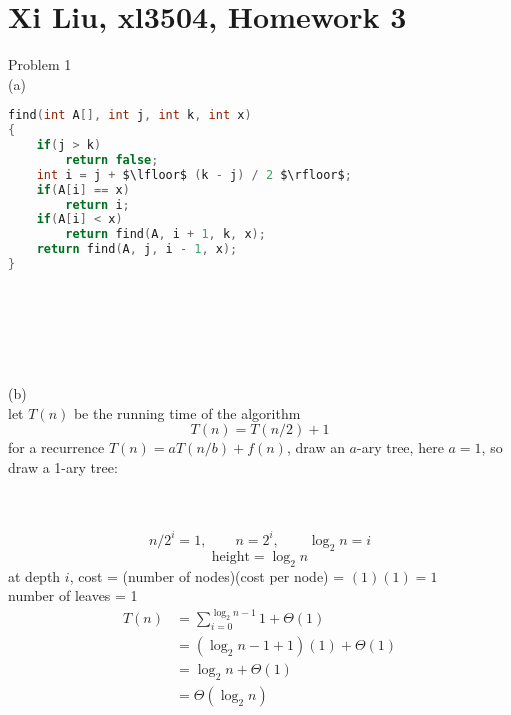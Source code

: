 \documentclass[12pt,border=4pt,multi]{article}%
\begin{document}
\section*{Xi Liu, xl3504, Homework 3}
Problem 1\\
(a)
\begin{lstlisting}[language = c, mathescape = true]
find(int A[], int j, int k, int x)
{
    if(j > k)
        return false;
    int i = j + $\lfloor$ (k - j) / 2 $\rfloor$;
    if(A[i] == x)
        return i;
    if(A[i] < x) 
        return find(A, i + 1, k, x); 
    return find(A, j, i - 1, x);
}
\end{lstlisting}
\leavevmode\\
\\
\\
\\
\\
(b)\\
let $T(n)$ be the running time of the algorithm
\[T(n) = T(n / 2) + 1\]
for a recurrence $T(n) = aT(n / b) + f(n)$, draw an $a$-ary tree, here $a = 1$, so draw a 1-ary tree:\\
\begin{center}
\end{center}
\leavevmode
\\
\\
\[n / 2^i = 1, \qquad n = 2^i, \qquad \log_2 n = i\]
\[\text{height} = \log_2 n\]
at depth $i$, cost = (number of nodes)(cost per node) = $(1)(1) = 1$\\
number of leaves = 1\\
\begin{align*}
    T(n) &= \sum_{i = 0}^{\log_2 n - 1} 1 + \Theta(1)\\
    &= (\log_2 n - 1 + 1)(1) + \Theta(1)\\
    &= \log_2 n + \Theta(1)\\
    &= \Theta(\log_2 n)\\
\end{align*}
\end{document}
